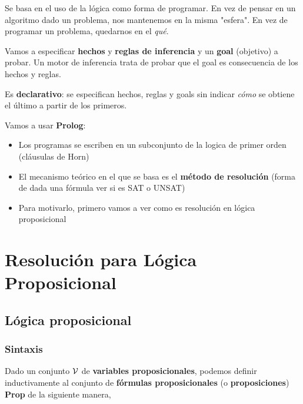\documentclass{report}
\theoremstyle{definition} %
\begin{document}
Se basa en el uso de la lógica como forma de programar. En vez de pensar en un
algoritmo dado un problema, nos mantenemos en la misma "esfera". En vez de
programar un problema, quedarnos en el \textit{qué}.

Vamos a especificar \textbf{hechos} y \textbf{reglas de inferencia} y un
\textbf{goal} (objetivo) a probar. Un motor de inferencia trata de probar que el
goal es consecuencia de los hechos y reglas.

Es \textbf{declarativo}: se especifican hechos, reglas y goals sin indicar
\textit{cómo} se obtiene el último a partir de los primeros.

Vamos a usar \textbf{Prolog}:

\begin{itemize}
    \item Los programas se escriben en un subconjunto de la logica de primer
    orden (cláusulas de Horn)
    \item El mecanismo teórico en el que se basa es el \textbf{método de
    resolución} (forma de dada una fórmula ver si es SAT o UNSAT)
    \item Para motivarlo, primero vamos a ver como es resolución en lógica
    proposicional
\end{itemize}

\section{Resolución para Lógica Proposicional}

\subsection{Lógica proposicional}

\subsubsection{Sintaxis}

Dado un conjunto $\mathcal{V}$ de \textbf{variables proposicionales}, podemos
definir inductivamente al conjunto de \textbf{fórmulas proposicionales} (o
\textbf{proposiciones}) \textbf{Prop} de la siguiente manera,
\end{document}
